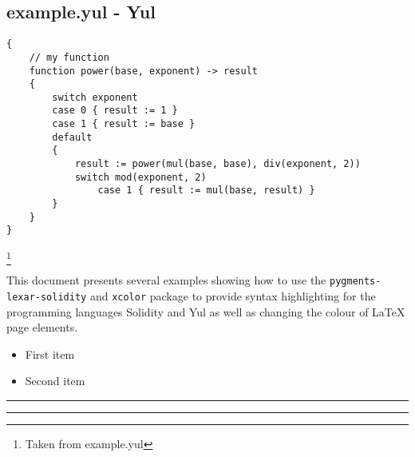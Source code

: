 \documentclass[runningheads]{llncs}
\begin{document}
\subsection{example.yul - Yul}
\begin{verbatim}
{
    // my function
    function power(base, exponent) -> result
    {
        switch exponent
        case 0 { result := 1 }
        case 1 { result := base }
        default
        {
            result := power(mul(base, base), div(exponent, 2))
            switch mod(exponent, 2)
                case 1 { result := mul(base, result) }
        }
    }
}
\end{verbatim}
\footnote{Taken from example.yul}

\newpage


\pagecolor{black}
\color{white}%

This document presents several examples showing how to use the \texttt{pygments-lexar-solidity} and \texttt{xcolor} package 
to provide syntax highlighting for the programming languages Solidity and Yul as well as changing the colour of \LaTeX{} page elements.

\begin{itemize}
\item \textcolor{Mycolor1}{First item}
\item \textcolor{Mycolor2}{Second item}
\end{itemize}

\noindent
{\color{LightRubineRed} \rule{\linewidth}{1mm}}

\noindent
{\color{RubineRed} \rule{\linewidth}{1mm}}
\end{document}
